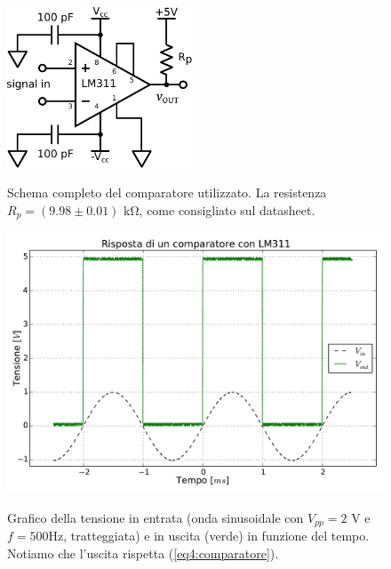 \begin{figure}[ht]
 \centering
   {\includegraphics[width=5.5cm]{../E04/latex/c_comparatore.pdf}}
 \caption{Schema completo del comparatore utilizzato. La resistenza $R_p=(9.98 \pm 0.01)$ \si{\kilo\ohm}, come consigliato sul datasheet.}
 \label{cir4:comparatore}
\end{figure}

\begin{figure}[ht]
 \centering
   {\includegraphics[width=14.5cm]{../E04/latex/comp.pdf}}
 \caption{Grafico della tensione in entrata (onda sinusoidale con $V_{pp}=2$ \si{\volt} e $f=500$\si{\hertz}, tratteggiata) e in uscita (verde) in funzione del tempo. Notiamo che l'uscita rispetta (\ref{eq4:comparatore}).}
 \label{gr4:comparatore}
\end{figure}

